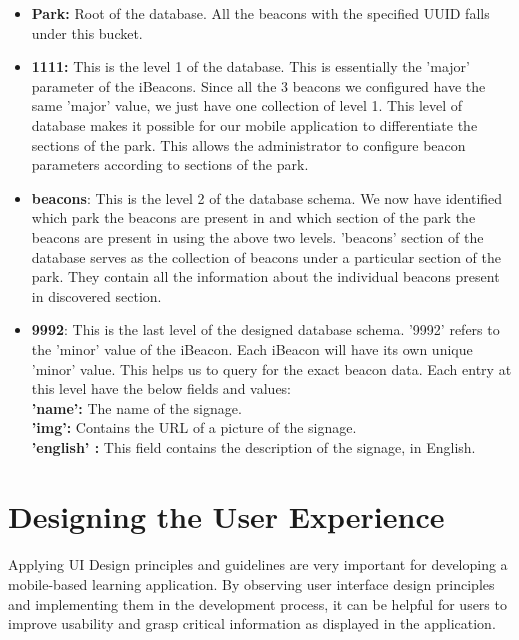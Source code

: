 \documentclass[12pt]{article}
\begin{document}
\begin{itemize}
  \item \textbf{Park:} Root of the database. All the beacons with the specified UUID falls under this bucket. 
  
  \item \textbf{1111:} This is the level 1 of the database. This is essentially the 'major' parameter of the iBeacons. Since all the 3 beacons we configured have the same 'major' value, we just have one collection of level 1. This level of database makes it possible for our mobile application to differentiate the sections of the park. This allows the administrator to configure beacon parameters according to sections of the park.
  
  \item \textbf{beacons}: This is the level 2 of the database schema. We now have identified which park the beacons are present in and which section of the park the beacons are present in using the above two levels. 'beacons' section of the database serves as the collection of beacons under a particular section of the park. They contain all the information about the individual beacons present in discovered section.
  
    \item \textbf{9992}: This is the last level of the designed database schema. '9992' refers to the 'minor' value of the iBeacon. Each iBeacon will have its own unique 'minor' value. This helps us to query for the exact beacon data. Each entry at this level have the below fields and values: \\
    
    \textbf{'name':} The name of the signage. \\
    \textbf{'img':} Contains the URL of a picture of the signage. \\
    \textbf{'english' :} This field contains the description of the signage, in English.\\
  
\end{itemize}



\section{Designing the User Experience}
\label{ux}
\paragraph{} Applying UI Design principles and guidelines are very important for developing a mobile-based learning application. By observing user interface design principles and implementing them in the development process, it can be helpful for users to improve usability and grasp critical information as displayed in the application. 
\end{document}
